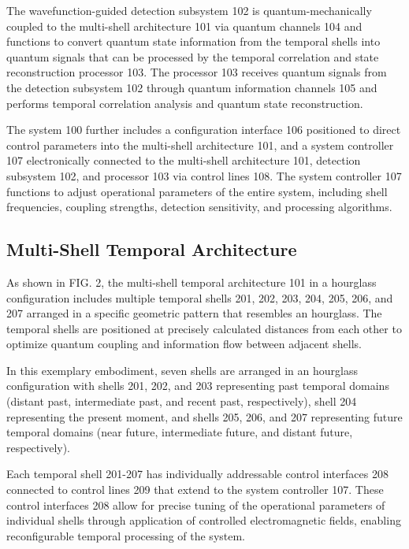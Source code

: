 \documentclass[12pt,letterpaper]{article}
\begin{document}
The wavefunction-guided detection subsystem 102 is quantum-mechanically coupled to the multi-shell architecture 101 via quantum channels 104 and functions to convert quantum state information from the temporal shells into quantum signals that can be processed by the temporal correlation and state reconstruction processor 103. The processor 103 receives quantum signals from the detection subsystem 102 through quantum information channels 105 and performs temporal correlation analysis and quantum state reconstruction.

The system 100 further includes a configuration interface 106 positioned to direct control parameters into the multi-shell architecture 101, and a system controller 107 electronically connected to the multi-shell architecture 101, detection subsystem 102, and processor 103 via control lines 108. The system controller 107 functions to adjust operational parameters of the entire system, including shell frequencies, coupling strengths, detection sensitivity, and processing algorithms.

\subsection{Multi-Shell Temporal Architecture}

As shown in FIG. 2, the multi-shell temporal architecture 101 in a hourglass configuration includes multiple temporal shells 201, 202, 203, 204, 205, 206, and 207 arranged in a specific geometric pattern that resembles an hourglass. The temporal shells are positioned at precisely calculated distances from each other to optimize quantum coupling and information flow between adjacent shells.

In this exemplary embodiment, seven shells are arranged in an hourglass configuration with shells 201, 202, and 203 representing past temporal domains (distant past, intermediate past, and recent past, respectively), shell 204 representing the present moment, and shells 205, 206, and 207 representing future temporal domains (near future, intermediate future, and distant future, respectively).

Each temporal shell 201-207 has individually addressable control interfaces 208 connected to control lines 209 that extend to the system controller 107. These control interfaces 208 allow for precise tuning of the operational parameters of individual shells through application of controlled electromagnetic fields, enabling reconfigurable temporal processing of the system.
\end{document}
